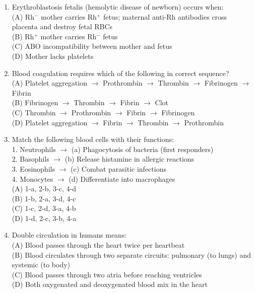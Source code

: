 \documentclass{article}
\begin{document}
\begin{enumerate}[label=Q\arabic*.]
\item Erythroblastosis fetalis (hemolytic disease of newborn) occurs when:
\\(A) Rh$^-$ mother carries Rh$^+$ fetus; maternal anti-Rh antibodies cross placenta and destroy fetal RBCs
\\(B) Rh$^+$ mother carries Rh$^-$ fetus
\\(C) ABO incompatibility between mother and fetus
\\(D) Mother lacks platelets

\item Blood coagulation requires which of the following in correct sequence?
\\(A) Platelet aggregation $\rightarrow$ Prothrombin $\rightarrow$ Thrombin $\rightarrow$ Fibrinogen $\rightarrow$ Fibrin
\\(B) Fibrinogen $\rightarrow$ Thrombin $\rightarrow$ Fibrin $\rightarrow$ Clot
\\(C) Thrombin $\rightarrow$ Prothrombin $\rightarrow$ Fibrin $\rightarrow$ Fibrinogen
\\(D) Platelet aggregation $\rightarrow$ Fibrin $\rightarrow$ Thrombin $\rightarrow$ Prothrombin

\item Match the following blood cells with their functions:\\
1. Neutrophils $\rightarrow$ (a) Phagocytosis of bacteria (first responders)\\
2. Basophils $\rightarrow$ (b) Release histamine in allergic reactions\\
3. Eosinophils $\rightarrow$ (c) Combat parasitic infections\\
4. Monocytes $\rightarrow$ (d) Differentiate into macrophages
\\(A) 1-a, 2-b, 3-c, 4-d
\\(B) 1-b, 2-a, 3-d, 4-c
\\(C) 1-c, 2-d, 3-a, 4-b
\\(D) 1-d, 2-c, 3-b, 4-a

\item Double circulation in humans means:
\\(A) Blood passes through the heart twice per heartbeat
\\(B) Blood circulates through two separate circuits: pulmonary (to lungs) and systemic (to body)
\\(C) Blood passes through two atria before reaching ventricles
\\(D) Both oxygenated and deoxygenated blood mix in the heart

\end{enumerate}
\end{document}
